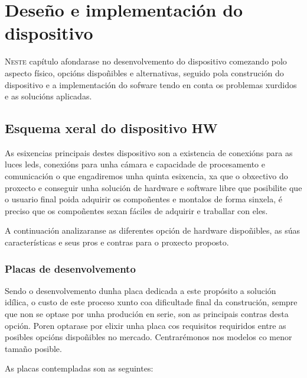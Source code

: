 \chapter{Deseño e implementación do dispositivo}
\label{chap:implementacion_dispositivo}
\lettrine{N}{este} capítulo afondarase no desenvolvemento do dispositivo comezando polo aspecto físico, opcións dispoñibles e alternativas, seguido pola construción do dispositivo e a implementación do sofware tendo en conta os problemas xurdidos e as solucións aplicadas.


\section{Esquema xeral do dispositivo HW}


As esixencias principais destes dispositivo son a existencia de conexións para as luces leds, conexións para unha cámara e capacidade de procesamento e comunicación o que engadiremos unha quinta esixencia, xa que o obxectivo do proxecto e conseguir unha solución de hardware e software libre que posibilite que o usuario final poida adquirir os compoñentes e montalos de forma sinxela, é preciso que os compoñentes sexan fáciles de adquirir e traballar con eles.

A continuación analizaranse as diferentes opción de hardware dispoñibles, as súas características e seus pros e contras para o proxecto proposto.

\subsection{Placas de desenvolvemento}


Sendo o desenvolvemento dunha placa dedicada a este propósito a solución idílica, o custo de este proceso xunto coa dificultade final da construción, sempre que non se optase por unha produción en serie, son as principais contras desta opción. Poren optarase por elixir unha placa cos requisitos requiridos entre as posibles opcións dispoñibles no mercado. Centrarémonos nos modelos co menor tamaño posible.

As placas contempladas son as seguintes:

